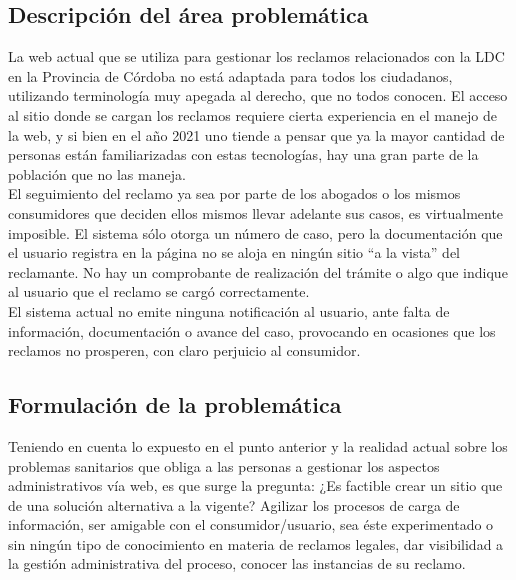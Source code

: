 		
	\subsection{Descripción del área problemática} \label{subsec: DescAreaProblem}
		La web actual que se utiliza para gestionar los reclamos relacionados con la LDC en la Provincia de Córdoba no está adaptada para todos los ciudadanos, utilizando terminología muy apegada al derecho, que no todos conocen. El acceso al sitio donde se cargan los reclamos requiere cierta experiencia en el manejo de la web, y si bien en el año 2021 uno tiende a pensar que ya la mayor cantidad de personas están familiarizadas con estas tecnologías, hay una gran parte de la población que no las maneja.\\
		
		El seguimiento del reclamo ya sea por parte de los abogados o los mismos consumidores que deciden ellos mismos llevar adelante sus casos, es virtualmente imposible. El sistema sólo otorga un número de caso, pero la documentación que el usuario registra en la página no se aloja en ningún sitio “a la vista” del reclamante. No hay un comprobante de realización del trámite o algo que indique al usuario que el reclamo se cargó correctamente.\\
		
		El sistema actual no emite ninguna notificación al usuario, ante falta de información, documentación o avance del caso, provocando en ocasiones que los reclamos no prosperen, con claro perjuicio al consumidor.
		
		
	\subsection{Formulación de la problemática} \label{subsec: FormProblema}
		Teniendo en cuenta lo expuesto en el punto anterior y la realidad actual sobre los problemas sanitarios que obliga a las personas a gestionar los aspectos administrativos vía web, es que surge la pregunta: ¿Es factible crear un sitio que de una solución alternativa a la vigente? Agilizar los procesos de carga de información, ser amigable con el consumidor/usuario, sea éste experimentado o sin ningún tipo de conocimiento en materia de reclamos legales, dar visibilidad a la gestión administrativa del proceso, conocer las instancias de su reclamo.
		
	